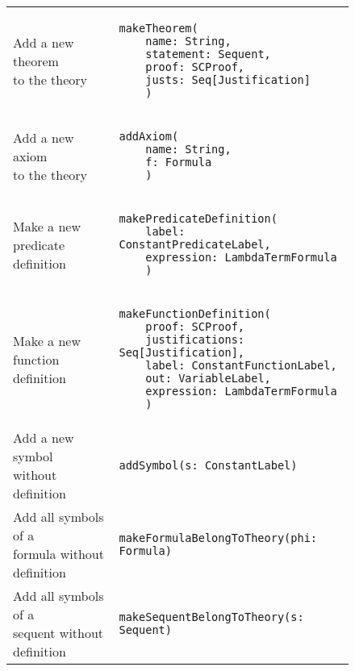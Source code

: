 {\begin{figure}
\begin{center}
\begin{tabular}{l|l}
\makecell[l]{Add a new theorem\\to the theory} & 
\begin{lstlisting}
makeTheorem(
	name: String,
	statement: Sequent,
	proof: SCProof,
	justs: Seq[Justification]
	)
\end{lstlisting}
\\ %

\makecell[l]{Add a new axiom\\ to the theory} & 
\begin{lstlisting}
addAxiom(
	name: String,
	f: Formula
	)
\end{lstlisting}
\\ %

\makecell[l]{Make a new\\predicate definition} & 
\begin{lstlisting}
makePredicateDefinition(
	label: ConstantPredicateLabel,
	expression: LambdaTermFormula
	)
\end{lstlisting} 
\\ %

\makecell[l]{Make a new\\function definition} & 
\begin{lstlisting}
makeFunctionDefinition(
	proof: SCProof,
	justifications: Seq[Justification],
	label: ConstantFunctionLabel,
	out: VariableLabel,
	expression: LambdaTermFormula
	)
\end{lstlisting}
\\ %

\makecell[l]{Add a new symbol\\without definition} & 
\begin{lstlisting}
addSymbol(s: ConstantLabel)
\end{lstlisting} 
\\ %

\makecell[l]{Add all symbols of a\\formula without definition} & 
\begin{lstlisting}
makeFormulaBelongToTheory(phi: Formula)
\end{lstlisting} 
\\ %

\makecell[l]{Add all symbols of a\\sequent without definition} & 
\begin{lstlisting}
makeSequentBelongToTheory(s: Sequent)
\end{lstlisting} 
\\ %


\end{tabular}
\end{center}
\end{figure}}
